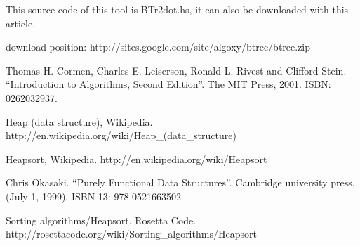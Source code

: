 \documentclass{article}
\begin{document}
This source code of this tool is BTr2dot.hs, it can also be downloaded 
with this article.

download position: http://sites.google.com/site/algoxy/btree/btree.zip

\begin{thebibliography}{99}

Thomas H. Cormen, Charles E. Leiserson, Ronald L. Rivest and Clifford Stein. ``Introduction to Algorithms, Second Edition''. The MIT Press, 2001. ISBN: 0262032937.

Heap (data structure), Wikipedia. http://en.wikipedia.org/wiki/Heap\_(data\_structure)

Heapsort, Wikipedia. http://en.wikipedia.org/wiki/Heapsort

Chris Okasaki. ``Purely Functional Data Structures''. Cambridge university press, (July 1, 1999), ISBN-13: 978-0521663502

Sorting algorithms/Heapsort. Rosetta Code. http://rosettacode.org/wiki/Sorting\_algorithms/Heapsort

\end{thebibliography}

\ifx\wholebook\relax \else
\end{document}

